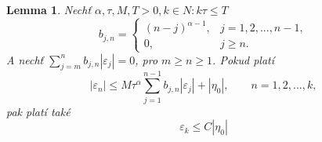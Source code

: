 \documentclass[a4paper,12pt,twoside]{article}
\newtheorem{lem}[veta]{Lemma}
\theoremstyle{definition}
\theoremstyle{remark}
\numberwithin{equation}{section}
\numberwithin{table}{section}
\numberwithin{figure}{section}
\begin{document}
\begin{lem} \label{LemmaOGlobChybe}
	Nechť $\alpha,\tau,M,T > 0, k \in N: k\tau\leq T$
	\begin{equation}
		b_{j,n} =\begin{cases} \left(n-j\right)^{\alpha-1}, & j = 1,2,...,n-1, \\ 0, & j \geq n.\end{cases}
	\end{equation}
	A nechť $\sum_{j=m}^{n} b_{j,n} |\varepsilon_{j}|=0$, pro $m \geq n\geq 1$.
	Pokud platí
	\begin{equation}
		|\varepsilon_{n}| \leq M \tau^{\alpha} \sum_{j = 1}^{n-1} b_{j,n} |\varepsilon_{j}| + |\eta_{0}|, \qquad n = 1,2,...,k,
	\end{equation}
	pak platí také
	\begin{equation}
		\varepsilon_{k}\leq C|\eta_{0}|
	\end{equation}
\end{lem}
\end{document}
